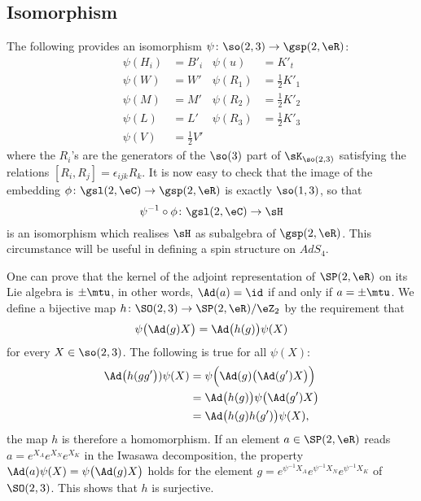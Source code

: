 \subsection{Isomorphism}		\label{SubSecIsosp}

The following provides an isomorphism $\psi\colon \so(2,3)\to \gsp(2,\eR)$:
\begin{align*}
\psi(H_i)&=B'_i		&\psi(u)&=K'_t\\
\psi(W)&=W'		&\psi(R_1)&=\frac{ 1 }{2}K'_1\\
\psi(M)&=M'		&\psi(R_2)&=\frac{ 1 }{2}K'_2\\
\psi(L)&=L'		&\psi(R_3)&=\frac{ 1 }{2}K'_3\\
\psi(V)&=\frac{ 1 }{2}V'
\end{align*}
where the $R_i$'s are the generators of the $\so(3)$ part of $\sK_{\so(2,3)}$ satisfying the relations $[R_i,R_j]=\epsilon_{ijk}R_k$. It is now easy to check that the image of the embedding $\phi\colon \gsl(2,\eC) \to \gsp(2,\eR)$ is exactly $\so(1,3)$, so that
\begin{equation}
\psi^{-1}\circ\phi\colon \gsl(2,\eC)\to \sH
\end{equation}
is an isomorphism which realises $\sH$ as subalgebra of $\gsp(2,\eR)$. This circumstance will be useful in defining a spin structure on $AdS_4$.

One can prove that the kernel of the adjoint representation of $\SP(2,\eR)$ on its Lie algebra is $\pm\mtu$, in other words, $\Ad(a)=\id$ if and only if $a=\pm\mtu$. We define a bijective map $h\colon \SO(2,3)\to \SP(2,\eR)/\eZ_2$ by the requirement that
\begin{equation}		\label{Eqdefhspsl}
  \psi\big( \Ad(g)X \big)=\Ad\big( h(g) \big)\psi(X)
\end{equation}
for every $X\in\so(2,3)$. The following is true for all $\psi(X)$:
\[
\begin{split}
\Ad\big(h(gg'\big)) \psi(X)&=\psi\Big( \Ad(g)\big( \Ad(g')X \big) \Big)\\
			&=\Ad\big( h(g) \big)\psi\big( \Ad(g')X \big)\\
			&=\Ad\big( h(g)h(g') \big)\psi(X),
\end{split}
\]
 the map $h$ is therefore a homomorphism. If an element $a\in \SP(2,\eR)$ reads $a= e^{X_A} e^{X_N} e^{X_K}$ in the Iwasawa decomposition, the property $\Ad(a)\psi(X)=\psi\big( \Ad(g)X \big)$ holds for the element\label{PgSolhpsiSP} $g= e^{\psi^{-1}X_A} e^{\psi^{-1}X_N} e^{\psi^{-1}X_K}$ of $\SO(2,3)$. This shows that $h$ is surjective.

